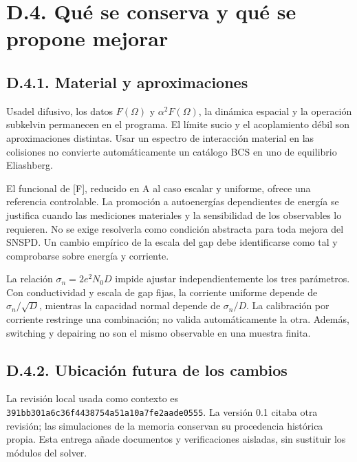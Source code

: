 \documentclass[
  spanish,
  10pt,
  a4paper,
]{article}
\begin{document}
\section{D.4. Qué se conserva y qué se propone
mejorar}\label{d.4.-quuxe9-se-conserva-y-quuxe9-se-propone-mejorar}

\subsection{D.4.1. Material y
aproximaciones}\label{d.4.1.-material-y-aproximaciones}

Usadel difusivo, los datos \(F(\Omega)\) y \(\alpha^2F(\Omega)\), la
dinámica espacial y la operación subkelvin permanecen en el programa. El
límite sucio y el acoplamiento débil son aproximaciones distintas. Usar
un espectro de interacción material en las colisiones no convierte
automáticamente un catálogo BCS en uno de equilibrio Eliashberg.

El funcional de {[}F{]}, reducido en A al caso escalar y uniforme,
ofrece una referencia controlable. La promoción a autoenergías
dependientes de energía se justifica cuando las mediciones materiales y
la sensibilidad de los observables lo requieren. No se exige resolverla
como condición abstracta para toda mejora del SNSPD. Un cambio empírico
de la escala del gap debe identificarse como tal y comprobarse sobre
energía y corriente.

La relación \(\sigma_n=2e^2N_0D\) impide ajustar independientemente los
tres parámetros. Con conductividad y escala de gap fijas, la corriente
uniforme depende de \(\sigma_n/\sqrt D\), mientras la capacidad normal
depende de \(\sigma_n/D\). La calibración por corriente restringe una
combinación; no valida automáticamente la otra. Además, switching y
depairing no son el mismo observable en una muestra finita.

\subsection{D.4.2. Ubicación futura de los
cambios}\label{d.4.2.-ubicaciuxf3n-futura-de-los-cambios}

La revisión local usada como contexto es
\nolinkurl{391bb301a6c36f4438754a51a10a7fe2aade0555}. La versión 0.1 citaba
otra revisión; las simulaciones de la memoria conservan su procedencia
histórica propia. Esta entrega añade documentos y verificaciones
aisladas, sin sustituir los módulos del solver.
\end{document}
